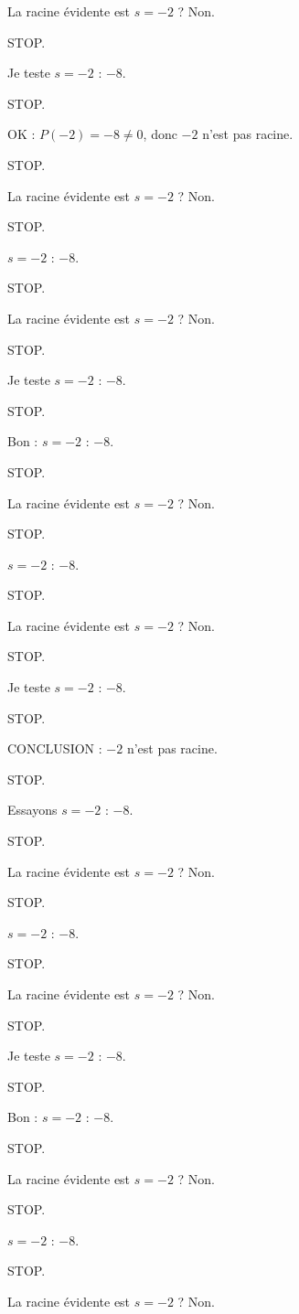 \documentclass[11pt]{article}
\begin{document}
\begin{exoresolu}
\begin{enumerate}
La racine évidente est $s = -2$ ? Non. 

STOP. 

Je teste $s = -2$ : $-8$. 

STOP. 

OK : $P(-2) = -8 \neq 0$, donc $-2$ n'est pas racine. 

STOP. 

La racine évidente est $s = -2$ ? Non. 

STOP. 

$s = -2$ : $-8$. 

STOP. 

La racine évidente est $s = -2$ ? Non. 

STOP. 

Je teste $s = -2$ : $-8$. 

STOP. 

Bon : $s = -2$ : $-8$. 

STOP. 

La racine évidente est $s = -2$ ? Non. 

STOP. 

$s = -2$ : $-8$. 

STOP. 

La racine évidente est $s = -2$ ? Non. 

STOP. 

Je teste $s = -2$ : $-8$. 

STOP. 

CONCLUSION : $-2$ n'est pas racine. 

STOP. 

Essayons $s = -2$ : $-8$. 

STOP. 

La racine évidente est $s = -2$ ? Non. 

STOP. 

$s = -2$ : $-8$. 

STOP. 

La racine évidente est $s = -2$ ? Non. 

STOP. 

Je teste $s = -2$ : $-8$. 

STOP. 

Bon : $s = -2$ : $-8$. 

STOP. 

La racine évidente est $s = -2$ ? Non. 

STOP. 

$s = -2$ : $-8$. 

STOP. 

La racine évidente est $s = -2$ ? Non. 


\end{enumerate}
\end{exoresolu}
\end{document}
